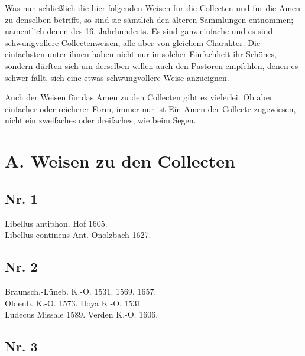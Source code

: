 Was nun schließlich die hier folgenden Weisen für die Collecten und für die Amen zu denselben betrifft, so sind sie sämtlich den älteren Sammlungen entnommen; namentlich denen des 16. Jahrhunderts. Es sind ganz einfache und es sind schwungvollere Collectenweisen, alle aber von gleichem Charakter. Die einfachsten unter ihnen haben nicht nur in solcher Einfachheit ihr Schönes, sondern dürften sich um derselben willen auch den Pastoren empfehlen, denen es schwer fällt, sich eine etwas schwungvollere Weise anzueignen.

Auch der Weisen für das Amen zu den Collecten gibt es vielerlei. Ob aber einfacher oder reicherer Form, immer nur ist Ein Amen der Collecte zugewiesen, nicht ein zweifaches oder dreifaches, wie beim Segen.

\section{A. Weisen zu den Collecten}

\subsection{Nr. 1}

Libellus antiphon. Hof 1605.\\
Libellus continens Ant. Onolzbach 1627.



\subsection{Nr. 2}

Braunsch.-Lüneb. K.-O. 1531. 1569. 1657.\\
Oldenb. K.-O. 1573. Hoya K.-O. 1531.\\
Ludecus Missale 1589. Verden K.-O. 1606.


\subsection{Nr. 3}


